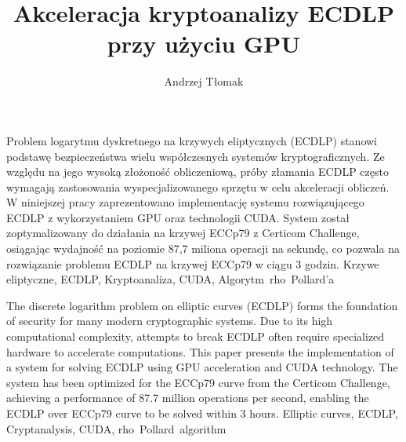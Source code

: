 \documentclass[
    left=2.5cm,         %
    right=2.5cm,        %
    top=2.5cm,          %
    bottom=3cm,         %
    bindingoffset=6mm,  %
    nohyphenation=true %
]{eiti/eiti-thesis} %
\begin{document}
\RaportThesis
{}
\title{
    Akceleracja kryptoanalizy ECDLP przy użyciu GPU
}
\author{Andrzej Tłomak}
\date{\the\year}
\maketitle

\streszczenie
Problem logarytmu dyskretnego na krzywych eliptycznych (ECDLP) stanowi podstawę
bezpieczeństwa wielu współczesnych systemów kryptograficznych.
Ze względu na jego wysoką złożoność obliczeniową,
próby złamania ECDLP często wymagają zastosowania wyspecjalizowanego sprzętu w celu akceleracji obliczeń.
W niniejszej pracy zaprezentowano implementację systemu rozwiązującego ECDLP
z wykorzystaniem GPU oraz technologii CUDA.
System został zoptymalizowany do działania na krzywej ECCp79 z Certicom Challenge,
osiągając wydajność na poziomie 87,7 miliona operacji na sekundę,
co pozwala na rozwiązanie problemu ECDLP na krzywej ECCp79 w ciągu 3 godzin.
\slowakluczowe Krzywe eliptyczne, ECDLP, Kryptoanaliza, CUDA, Algorytm~rho~Pollard'a
\newpage

\abstract
The discrete logarithm problem on elliptic curves (ECDLP) forms the foundation of
security for many modern cryptographic systems.
Due to its high computational complexity, attempts to break ECDLP often
require specialized hardware to accelerate computations.
This paper presents the implementation of a system for solving ECDLP using GPU acceleration and CUDA technology.
The system has been optimized for the ECCp79 curve from the Certicom Challenge,
achieving a performance of 87.7 million operations per second,
enabling the ECDLP over ECCp79 curve to be solved within 3 hours.
\keywords Elliptic curves, ECDLP, Cryptanalysis, CUDA, rho~Pollard~algorithm
\newpage

\thispagestyle{empty}
\tableofcontents
\end{document}
